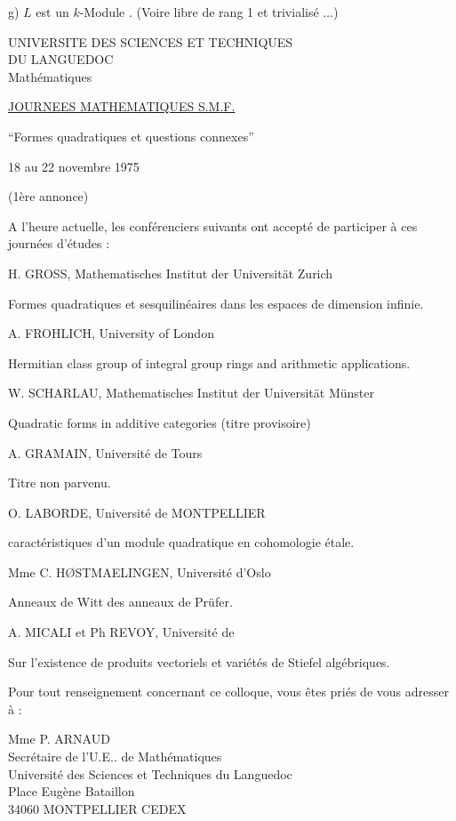 g) $L$ est un $k$-Module .
(Voire libre de rang 1 et trivialisé $\ldots$)

UNIVERSITE DES SCIENCES ET TECHNIQUES\\
DU LANGUEDOC\\
Mathématiques

\uline{JOURNEES MATHEMATIQUES S.M.F.}

``Formes quadratiques et questions connexes''

18 au 22 novembre 1975

(1ère annonce)

A l'heure actuelle, les conférenciers suivants ont accepté de participer à ces journées d'études :

H. GROSS, Mathematisches Institut der Universität Zurich

Formes quadratiques et sesquilinéaires dans les espaces de dimension infinie.

A. FROHLICH, University of London

Hermitian class group of integral group rings and arithmetic applications.

W. SCHARLAU, Mathematisches Institut der Universität Münster

Quadratic forms in additive categories (titre provisoire)

A. GRAMAIN, Université de Tours

Titre non parvenu.

O. LABORDE, Université de MONTPELLIER

 caractéristiques d'un module quadratique en cohomologie étale.

Mme C. HØSTMAELINGEN, Université d'Oslo

Anneaux de Witt des anneaux de Prüfer.

A. MICALI et Ph REVOY, Université de 

Sur l'existence de produits vectoriels et variétés de Stiefel algébriques.

Pour tout renseignement concernant ce colloque, vous êtes priés de vous adresser à :

Mme P. ARNAUD\\
Secrétaire de l'U.E.. de Mathématiques\\
Université des Sciences et Techniques du Languedoc\\
Place Eugène Bataillon\\
34060 MONTPELLIER CEDEX

